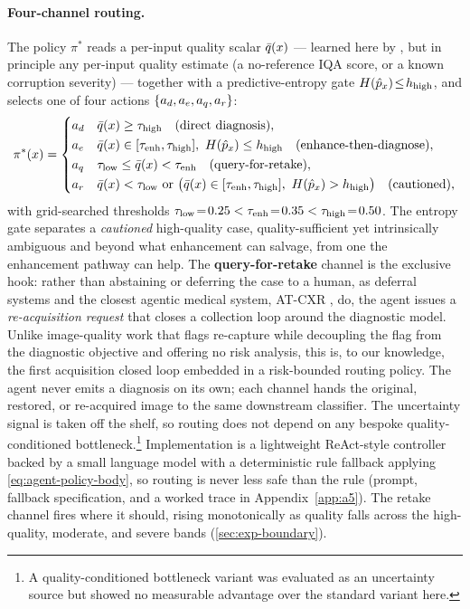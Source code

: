 \paragraph{Four-channel routing.}\label{sec:agent-routing}
The policy $\pi^{*}$ reads a per-input quality scalar $\bar{q}(x)$ --- learned here by \visiscore{},
but in principle any per-input quality estimate (a no-reference IQA score, or a known corruption
severity) --- together with a predictive-entropy gate $H(\hat p_x)\!\le\!h_{\mathrm{high}}$, and selects
one of four actions $\{a_d,a_e,a_q,a_r\}$:
\begin{equation}
\pi^{*}(x)=
\begin{cases}
\actd & \qbar(x)\geq\tauhigh \quad\text{(direct diagnosis)},\\[1pt]
\acte & \qbar(x)\in[\tauenh,\tauhigh],\ \Hent(\hat p_x)\leq\hhigh \quad\text{(enhance-then-diagnose)},\\[1pt]
\actq & \taulow\leq\qbar(x)<\tauenh \quad\text{(query-for-retake)},\\[1pt]
\actr & \qbar(x)<\taulow\ \text{or}\ \big(\qbar(x)\in[\tauenh,\tauhigh],\ \Hent(\hat p_x)>\hhigh\big) \quad\text{(cautioned)},
\end{cases}
\label{eq:agent-policy-body}
\end{equation}
with grid-searched thresholds $\tau_{\mathrm{low}}\!=\!0.25<\tau_{\mathrm{enh}}\!=\!0.35<\tau_{\mathrm{high}}\!=\!0.50$. The entropy
gate separates a \emph{cautioned} high-quality case, quality-sufficient yet intrinsically ambiguous
and beyond what enhancement can salvage, from one the enhancement pathway can help. The
\textbf{query-for-retake} channel is the exclusive hook: rather than abstaining
\citep{geifman2017selective} or deferring the case to a human, as deferral systems and the closest
agentic medical system, AT-CXR \citep{atcxr2025}, do, the agent issues a \emph{re-acquisition
request} that closes a collection loop around the diagnostic model. Unlike image-quality work that
flags re-capture \citep{vodrahalli2021teledermatology,jalaboi2023explainable} while decoupling the
flag from the diagnostic objective and offering no risk analysis, this is, to our knowledge, the
first acquisition closed loop embedded in a risk-bounded routing policy. The agent never emits a
diagnosis on its own; each channel hands the original, restored, or re-acquired image to the same
downstream classifier.
The uncertainty signal is taken off the shelf, so routing does not depend on any bespoke
quality-conditioned bottleneck.\footnote{A quality-conditioned bottleneck variant was evaluated as
an uncertainty source but showed no measurable advantage over the standard variant here.}
Implementation is a lightweight ReAct-style controller backed by a small language model with a
deterministic rule fallback applying \eqref{eq:agent-policy-body}, so routing is never less safe than
the rule (prompt, fallback specification, and a worked trace in Appendix~\ref{app:a5}). The retake
channel fires where it should, rising monotonically as quality falls across the high-quality,
moderate, and severe bands (\cref{sec:exp-boundary}).


